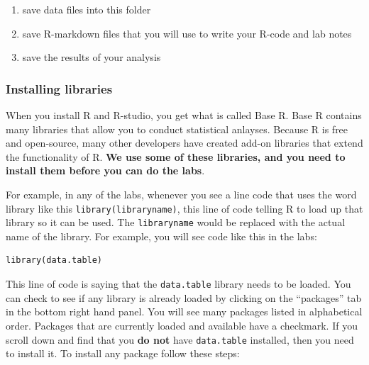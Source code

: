 \documentclass[]{book}
\providecommand{\tightlist}{%
  \setlength{\itemsep}{0pt}\setlength{\parskip}{0pt}}
\begin{document}
\begin{enumerate}
\def\labelenumi{\arabic{enumi}.}
\tightlist
\item
  save data files into this folder
\item
  save R-markdown files that you will use to write your R-code and lab
  notes
\item
  save the results of your analysis
\end{enumerate}

\subsubsection{Installing libraries}\label{installing-libraries}

When you install R and R-studio, you get what is called Base R. Base R
contains many libraries that allow you to conduct statistical anlayses.
Because R is free and open-source, many other developers have created
add-on libraries that extend the functionality of R. \textbf{We use some
of these libraries, and you need to install them before you can do the
labs}.

For example, in any of the labs, whenever you see a line code that uses
the word library like this \texttt{library(libraryname)}, this line of
code telling R to load up that library so it can be used. The
\texttt{libraryname} would be replaced with the actual name of the
library. For example, you will see code like this in the labs:

\begin{verbatim}
library(data.table)
\end{verbatim}

This line of code is saying that the \texttt{data.table} library needs
to be loaded. You can check to see if any library is already loaded by
clicking on the ``packages'' tab in the bottom right hand panel. You
will see many packages listed in alphabetical order. Packages that are
currently loaded and available have a checkmark. If you scroll down and
find that you \textbf{do not} have \texttt{data.table} installed, then
you need to install it. To install any package follow these steps:
\end{document}
